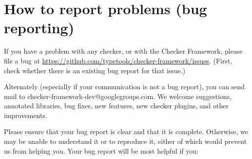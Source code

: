\section{How to report problems (bug reporting)\label{reporting-bugs}}

If you have a problem with any checker, or with the Checker Framework,
please file a bug at
\url{https://github.com/typetools/checker-framework/issues}.
(First, check whether there is an existing bug report for that issue.)

Alternately (especially if your communication is not a bug report), you can
send mail to checker-framework-dev@googlegroups.com.
We welcome suggestions, annotated libraries, bug fixes, new
features, new checker plugins, and other improvements.

Please ensure that your bug report is clear and that it is complete.
Otherwise, we may be unable to understand it or to reproduce it, either of
which would prevent us from helping you.  Your bug report will be most
helpful if you:

